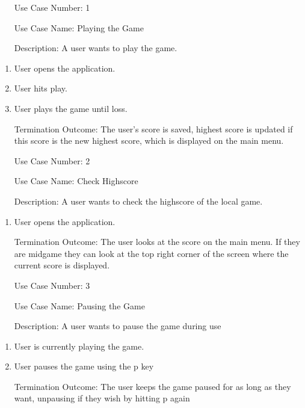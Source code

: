 \documentclass[10pt,conference,onecolumn,compsoc]{IEEEtran}
\begin{document}
\begin{itemize}
\item[Use Case Number:] 1
\item[Use Case Name:] Playing the Game
\item[Description:] A user wants to play the game.
\end{itemize}

\begin{enumerate}
\item User opens the application.
\item User hits play.
\item User plays the game until loss.
\item[Termination Outcome:] The user's score is saved, highest score is updated if this score is the new highest score, which is displayed on the main menu. 
\end{enumerate}

\begin{itemize}
\item[Use Case Number:] 2
\item[Use Case Name:] Check Highscore
\item[Description:] A user wants to check the highscore of the local game.
\end{itemize}

\begin{enumerate}
\item User opens the application.
\item[Termination Outcome:] The user looks at the score on the main menu. If they are midgame they can look at the top right corner of the screen where the current score is displayed.
\end{enumerate}


\begin{itemize}
\item[Use Case Number:] 3
\item[Use Case Name:] Pausing the Game
\item[Description:] A user wants to pause the game during use
\end{itemize}

\begin{enumerate}
\item User is currently playing the game.
\item User pauses the game using the p key
\item[Termination Outcome:] The user keeps the game paused for as long as they want, unpausing if they wish by hitting p again
\end{enumerate}
\end{document}
